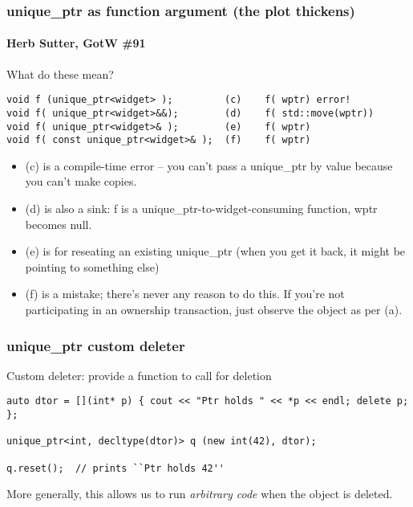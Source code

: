 \begin{frame}[fragile]
\frametitle{unique\_ptr as function argument (the plot thickens)}
\framesubtitle{Herb Sutter, GotW \#91}

What do these mean?

{\scriptsize\begin{verbatim}
void f (unique_ptr<widget> );         (c)    f( wptr) error!
void f( unique_ptr<widget>&&);        (d)    f( std::move(wptr))
void f( unique_ptr<widget>& );        (e)    f( wptr)
void f( const unique_ptr<widget>& );  (f)    f( wptr)
\end{verbatim}}

\begin{itemize}
\item (c) is a compile-time error -- you can't pass a unique\_ptr by
  value because you can't make copies.
\item (d) is also a sink:  f is a unique\_ptr-to-widget-consuming
  function, wptr becomes null.
\pause{}
\item (e) is for reseating an existing unique\_ptr (when you get it
  back, it might be pointing to something else)
\pause{}
\item (f) is a mistake; there's never any reason to do this.  If
  you're not participating in an ownership transaction, just observe
  the object as per (a).
\end{itemize}

\end{frame}



\begin{frame}[fragile]
\frametitle{unique\_ptr custom deleter}
Custom deleter: provide a function to call for deletion
{\scriptsize\begin{verbatim}
auto dtor = [](int* p) { cout << "Ptr holds " << *p << endl; delete p; };

unique_ptr<int, decltype(dtor)> q (new int(42), dtor);

q.reset();  // prints ``Ptr holds 42''
\end{verbatim}}


\vskip 12pt

More generally, this allows us to run \emph{arbitrary code} when the
object is deleted.


\end{frame}



